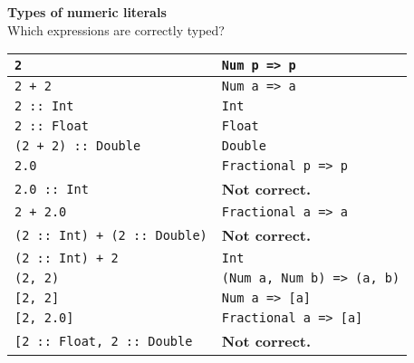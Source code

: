 \textbf{Types of numeric literals}\\
Which expressions are correctly typed?\\
\begin{tabularx}{\linewidth}{|l|X|}
  \hline
  \lstinline|2| & \lstinline|Num p => p|\\
  \hline
  \lstinline|2 + 2| & \lstinline|Num a => a|\\
  \hline
  \lstinline|2 :: Int| & \lstinline|Int|\\
  \hline
  \lstinline|2 :: Float| & \lstinline|Float|\\
  \hline
  \lstinline|(2 + 2) :: Double| & \lstinline|Double|\\
  \hline
  \lstinline|2.0| & \lstinline|Fractional p => p|\\
  \hline
  \lstinline|2.0 :: Int| & \textbf{Not correct.}\\
  \hline
  \lstinline|2 + 2.0| & \lstinline|Fractional a => a|\\
  \hline
  \lstinline|(2 :: Int) + (2 :: Double)| & \textbf{Not correct.}\\
  \hline
  \lstinline|(2 :: Int) + 2| & \lstinline|Int|\\
  \hline
  \lstinline|(2, 2)| & \lstinline|(Num a, Num b) => (a, b)|\\
  \hline
  \lstinline|[2, 2]| & \lstinline|Num a => [a]|\\
  \hline
  \lstinline|[2, 2.0]| & \lstinline|Fractional a => [a]|\\
  \hline
  \lstinline|[2 :: Float, 2 :: Double| & \textbf{Not correct.}\\
  \hline
\end{tabularx}


